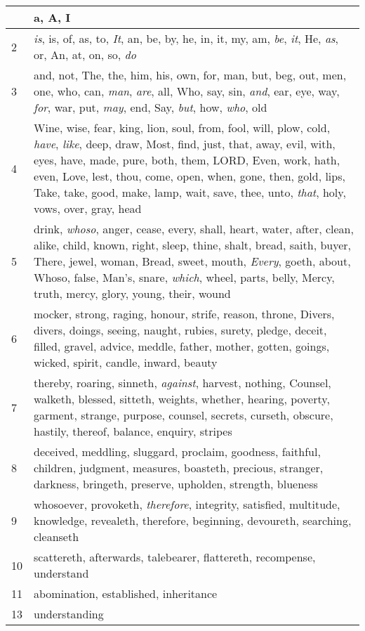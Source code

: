 \begin{center}
\begin{longtable}{l|p{3.75in}}
\hline \hline 
\endlastfoot 
1 & a, A, I\\ \hline 
2 & \emph{is}, is, of, as, to, \emph{It}, an, be, by, he, in, it, my, am, \emph{be}, \emph{it}, He, \emph{as}, or, An, at, on, so, \emph{do}\\ \hline 
3 & and, not, The, the, him, his, own, for, man, but, beg, out, men, one, who, can, \emph{man}, \emph{are}, all, Who, say, sin, \emph{and}, ear, eye, way, \emph{for}, war, put, \emph{may}, end, Say, \emph{but}, how, \emph{who}, old\\ \hline 
4 & Wine, wise, fear, king, lion, soul, from, fool, will, plow, cold, \emph{have}, \emph{like}, deep, draw, Most, find, just, that, away, evil, with, eyes, have, made, pure, both, them, LORD, Even, work, hath, even, Love, lest, thou, come, open, when, gone, then, gold, lips, Take, take, good, make, lamp, wait, save, thee, unto, \emph{that}, holy, vows, over, gray, head\\ \hline 
5 & drink, \emph{whoso}, anger, cease, every, shall, heart, water, after, clean, alike, child, known, right, sleep, thine, shalt, bread, saith, buyer, There, jewel, woman, Bread, sweet, mouth, \emph{Every}, goeth, about, Whoso, false, Man's, snare, \emph{which}, wheel, parts, belly, Mercy, truth, mercy, glory, young, their, wound\\ \hline 
6 & mocker, strong, raging, honour, strife, reason, throne, Divers, divers, doings, seeing, naught, rubies, surety, pledge, deceit, filled, gravel, advice, meddle, father, mother, gotten, goings, wicked, spirit, candle, inward, beauty\\ \hline 
7 & thereby, roaring, sinneth, \emph{against}, harvest, nothing, Counsel, walketh, blessed, sitteth, weights, whether, hearing, poverty, garment, strange, purpose, counsel, secrets, curseth, obscure, hastily, thereof, balance, enquiry, stripes\\ \hline 
8 & deceived, meddling, sluggard, proclaim, goodness, faithful, children, judgment, measures, boasteth, precious, stranger, darkness, bringeth, preserve, upholden, strength, blueness\\ \hline 
9 & whosoever, provoketh, \emph{therefore}, integrity, satisfied, multitude, knowledge, revealeth, therefore, beginning, devoureth, searching, cleanseth\\ \hline 
10 & scattereth, afterwards, talebearer, flattereth, recompense, understand\\ \hline 
11 & abomination, established, inheritance\\ \hline 
13 & understanding\\ \hline 
\end{longtable} 
\end{center} 




 
